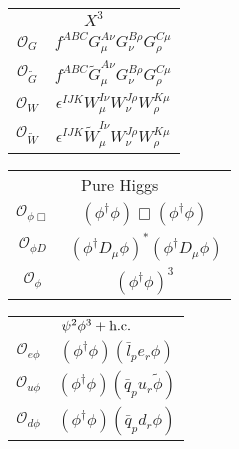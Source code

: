 \begin{table}
	\begin{center}
		\footnotesize
			\vspace{-.35cm}
		\hspace{-2.7 cm}
		\begin{minipage}[t]{4.6cm}
			\renewcommand{\arraystretch}{1.5}
			\begin{tabular}[t]{c|c}
				\multicolumn{2}{c}{$X^3$} \\
				\toplinetwo
				$\mathcal{O}_G$                & $f^{ABC} G_\mu^{A\nu} G_\nu^{B\rho} G_\rho^{C\mu} $ \\
				$\mathcal{O}_{\widetilde G}$          & $f^{ABC} \widetilde G_\mu^{A\nu} G_\nu^{B\rho} G_\rho^{C\mu} $ \\
				$\mathcal{O}_W$                & $\epsilon^{IJK} W_\mu^{I\nu} W_\nu^{J\rho} W_\rho^{K\mu}$ \\ 
				$\mathcal{O}_{\widetilde W}$          & $\epsilon^{IJK} \widetilde W_\mu^{I\nu} W_\nu^{J\rho} W_\rho^{K\mu}$ \\
			\end{tabular}
		\end{minipage}
		\begin{minipage}[t]{4.6cm}
			\renewcommand{\arraystretch}{1.5}
			\begin{tabular}[t]{c|c}
				\multicolumn{2}{c}{Pure Higgs} \\
				\toplinetwo
				$\mathcal{O}_{\phi\Box}$ & $(\phi^\dag \phi)\Box(\phi^\dag \phi)$ \\
				$\mathcal{O}_{\phi D}$   & $\ \left(\phi^\dag D_\mu \phi\right)^* \left(\phi^\dag D_\mu \phi\right)$ \\
				$\mathcal{O}_\phi$       & $(\phi^\dag \phi)^3$ 
			\end{tabular}
		\end{minipage}
		\begin{minipage}[t]{2.7cm}
			
			\renewcommand{\arraystretch}{1.5}
			\begin{tabular}[t]{c|c}
				\multicolumn{2}{c}{$ \psi^2\phi^3 + \hbox{h.c.}$} \\
				\toplinetwo
				$\mathcal{O}_{e\phi}$           & $(\phi^\dag \phi)(\bar l_p e_r \phi)$ \\
				$\mathcal{O}_{u\phi}$          & $(\phi^\dag \phi)(\bar q_p u_r \widetilde \phi )$ \\
				$\mathcal{O}_{d\phi}$           & $(\phi^\dag \phi)(\bar q_p d_r \phi)$\\
			\end{tabular}
		\end{minipage}
		

\end{center}
\end{table}

